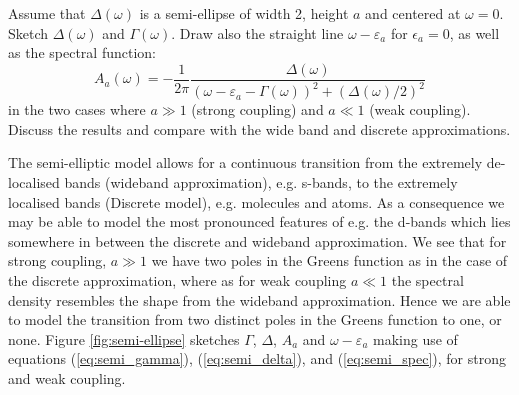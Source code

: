 \begin{exercise}
Assume that $\Delta(\omega)$ is a semi-ellipse of width 2, height $a$ and centered at $\omega = 0$. Sketch $\Delta(\omega)$ and $\Gamma(\omega)$. Draw also the straight line $\omega-\varepsilon_a$ for $\epsilon_a = 0$, as well as the spectral function:
\begin{equation}\label{eq:semi_spec}
    A_a(\omega) = -\dfrac{1}{2\pi} \dfrac{\Delta(\omega)}{(\omega - \varepsilon_a -\Gamma(\omega))^2 + (\Delta(\omega)/2)^2}
\end{equation}
in the two cases where $a \gg 1$ (strong coupling) and $a \ll 1$ (weak coupling). Discuss the results and compare with the wide band and discrete approximations.
\end{exercise}
\begin{solution}
The semi-elliptic model allows for a continuous transition from the extremely de-localised bands (wideband approximation), e.g. s-bands, to the extremely localised bands (Discrete model), e.g. molecules and atoms. As a consequence we may be able to model the most pronounced features of e.g. the d-bands which lies somewhere in between the discrete and wideband approximation. We see that for strong coupling, $a \gg 1$ we have two poles in the Greens function as in the case of the discrete approximation, where as for weak coupling $a \ll 1$ the spectral density resembles the shape from the wideband approximation. Hence we are able to model the transition from two distinct poles in the Greens function to one, or none. Figure \ref{fig:semi-ellipse} sketches $\Gamma$, $\Delta$, $A_a$ and $\omega - \varepsilon_a$ making use of equations (\ref{eq:semi_gamma}), (\ref{eq:semi_delta}), and (\ref{eq:semi_spec}), for strong and weak coupling.

\begin{figure}
\begin{minipage}{0.49\textwidth}
    \centering
\end{minipage}
\end{figure}
\end{solution}
